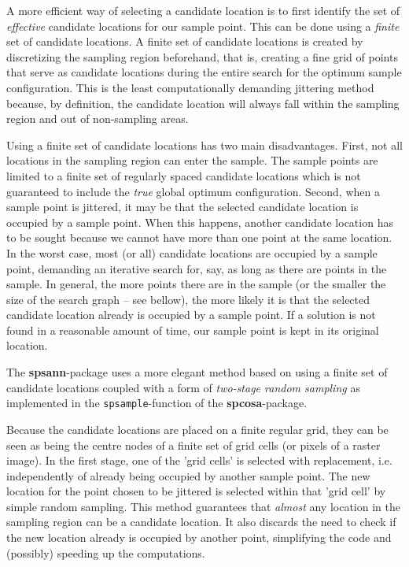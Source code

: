 A more efficient way of selecting a candidate location is to first identify the
set of \textit{effective} candidate locations for our sample point. This can be
done using a \textit{finite} set of candidate locations. A finite set of 
candidate locations is created by discretizing the sampling region beforehand, 
that is, creating a fine grid of points that serve as candidate locations during
the entire search for the optimum sample configuration. This is the least 
computationally demanding jittering method because, by definition, the candidate
location will always fall within the sampling region and out of non-sampling 
areas.

Using a finite set of candidate locations has two main disadvantages. First, not
all locations in the sampling region can enter the sample. The sample points are
limited to a finite set of regularly spaced candidate locations which is not 
guaranteed to include the \textit{true} global optimum configuration. Second, 
when a sample point is jittered, it may be that the selected candidate location
is occupied by a sample point. When this happens, another candidate location 
has to be sought because we cannot have more than one point at the same 
location. In the worst case, most (or all) candidate locations are occupied by 
a sample point, demanding an iterative search for, say, as long as there are 
points in the sample. In general, the more points there are in the sample (or 
the smaller the size of the search graph -- see bellow), the more likely it is 
that the selected candidate location already is occupied by a sample point. If 
a solution is not found in a reasonable amount of time, our sample point is 
kept in its original location.

The \textbf{spsann}-package uses a more elegant method based on using a finite
set of candidate locations coupled with a form of \textit{two-stage random 
sampling} as implemented in the \texttt{spsample}-function of the 
\textbf{spcosa}-package.

 Because 
the candidate locations are placed on a finite regular grid, they can be 
seen as being the centre nodes of a finite set of grid cells (or pixels of 
a raster image). In the first stage, one of the 'grid cells' is selected 
with replacement, i.e. independently of already being occupied by 
another sample point. The new location for the point chosen to be jittered 
is selected within that 'grid cell' by simple random sampling. This 
method guarantees that \textit{almost} any location in the sampling region can 
be a candidate location. It also discards the need to check if the new 
location already is occupied by another point, simplifying the code and 
(possibly) speeding up the computations.
 
